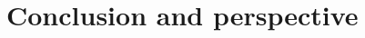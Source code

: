 \documentclass[table]{report}
\begin{document}
%
%
% 
%
%
%
%
%
%
%
%


\chapter{Conclusion and perspective}
\minitoc
%


\nocite{*}





\listoffigures

\end{document}
